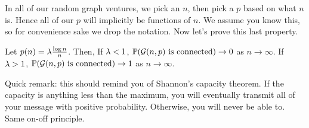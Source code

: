 \documentclass[11 pt]{scrartcl}
\begin{document}
In all of our random graph ventures, we pick an $n$, then pick a $p$ based on what $n$ is. Hence all of our $p$ will implicitly be functions of $n$. We assume you know this, so for convenience sake we drop the notation. Now let's prove this last property. 

\begin{theorem}
    Let $p(n) = \lambda\frac{\log n}{n}$. Then, 
    \alphanum
        \ii If $\lambda < 1$, $\mathbb P(\mathcal G(n,p) \text{ is connected})\to 0$ as $n\to\infty$.
        \ii If $\lambda > 1$, $\mathbb P(\mathcal G(n,p) \text{ is connected})\to 1$ as $n\to\infty$.
    \enumend
    \label{thm:connected}
\end{theorem}
Quick remark: this should remind you of Shannon's capacity theorem. If the capacity is anything less than the maximum, you will eventually transmit all of your message with positive probability. Otherwise, you will never be able to. Same on-off principle.
\end{document}
